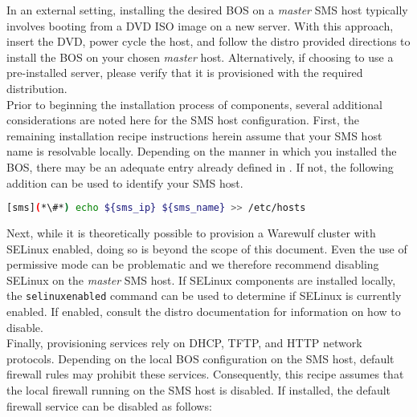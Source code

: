 In an external setting, installing the desired BOS on a
{\em master} SMS host typically involves booting from a DVD ISO image on a new
server. With this approach, insert the \baseOS{} DVD, power cycle the host, and
follow the distro provided directions to install the BOS on your chosen {\em
master} host.  Alternatively, if choosing to use a pre-installed server, please
verify that it is provisioned with the required \baseOS{} distribution. \\

Prior to beginning the installation process of \OHPC{} components, several additional
considerations are noted here for the SMS host configuration. First, 
the remaining installation recipe instructions herein assume that
your SMS host name is resolvable locally. Depending on the manner in which you
installed the BOS, there may be an adequate entry already defined
in . If not, the following addition can be used to identify
your SMS host.
\begin{lstlisting}[language=bash]
[sms](*\#*) echo ${sms_ip} ${sms_name} >> /etc/hosts
\end{lstlisting}

Next, while it is theoretically possible to provision a Warewulf cluster with SELinux
enabled, doing so is beyond the scope of this document. Even the use of
permissive mode can be problematic and we therefore recommend disabling SELinux on the {\em
master} SMS host. If SELinux components are installed locally,
the \texttt{selinuxenabled} command can be used to determine if SELinux is
currently enabled. If enabled, consult the distro documentation for information
on how to disable. \\

Finally, provisioning services rely on DHCP, TFTP, and HTTP network protocols.
Depending on the local BOS configuration on the SMS host, default firewall
rules may prohibit these services. Consequently, this recipe assumes that the local
firewall running on the SMS host is disabled. If installed, the default
firewall service can be disabled as follows:
